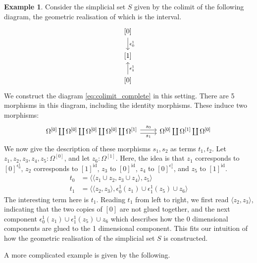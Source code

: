 \documentclass[12pt]{article}
\theoremstyle{plain}
\theoremstyle{definition}
\newtheorem{example}[thm]{Example}
\begin{document}
\begin{example}\label{ex:interval}
	Consider the simplicial set $S$ given by the colimit of the following diagram, the geometric realisation of which is the interval.
	\[\begin{tikzcd}
		{[0]} \\
		{[1]} \\
		{[0]}
		\arrow["{\epsilon_0^1}", from=1-1, to=2-1]
		\arrow["{\epsilon_1^1}"', from=3-1, to=2-1]
	\end{tikzcd}\]
	We construct the diagram \eqref{eq:colimit_complete} in this setting. There are 5 morphisms in this diagram, including the identity morphisms. These induce two morphisms:
	\begin{equation}
		\begin{tikzcd}
			{\Omega^{[0]} \coprod \Omega^{[0]} \coprod \Omega^{[0]} \coprod \Omega^{[0]} \coprod \Omega^{[1]}}\arrow[r,shift left, "{s_0}"]\arrow[r,shift right,swap,"{s_1}"] & {\Omega^{[0]} \coprod \Omega^{[1]} \coprod \Omega^{[0]}}
		\end{tikzcd}
	\end{equation}
	We now give the description of these morphisms $s_1,s_2$ as terms $t_1,t_2$. Let $z_1, z_2, z_3, z_4, z_5 : \Omega^{[0]}$, and let $z_6 : \Omega^{[1]}$. Here, the idea is that $z_1$ corresponds to $[0]^{\epsilon_0^1}$, $z_2$ corresponds to $[1]^{\operatorname{id}}$, $z_3$ to $[0]^{\operatorname{id}}$, $z_4$ to $[0]^{\epsilon_1^1}$, and $z_5$ to $[1]^{\operatorname{id}}$.
	\begin{align}
		t_0 &=\langle \langle z_1 \cup z_2, z_3 \cup z_4 \rangle , z_5 \rangle \\
		t_1 &= \langle \langle z_2, z_3\rangle, \epsilon_0^1(z_1) \cup \epsilon_1^1(z_5) \cup z_6 \rangle
	\end{align}
	The interesting term here is $t_1$. Reading $t_1$ from left to right, we first read $\langle z_2, z_3\rangle$, indicating that the two copies of $[0]$ are not glued together, and the next component $\epsilon_0^1(z_1) \cup \epsilon_1^1(z_5) \cup z_6$ which describes how the 0 dimensional components are glued to the 1 dimensional component. This fits our intuition of how the geometric realisation of the simplicial set $S$ is constructed.
\end{example}
A more complicated example is given by the following.
\end{document}
